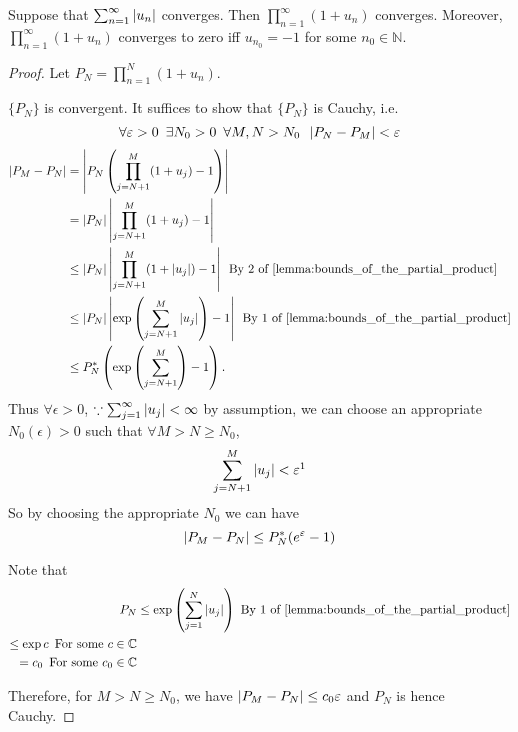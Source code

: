 \documentclass[notoc,notitlepage]{tufte-book}
\begin{document}
\begin{thm}[Theorem 19]\label{thm:theorem_19}
  Suppose that $\sum_{n=1}^{\infty} \left|u_n\right|$ converges. Then $\prod_{n=1}^{\infty} (1 + u_n)$ converges. Moreover, $\prod_{n=1}^{\infty} (1 + u_n)$ converges to zero iff $u_{n_0} = -1$ for some $n_0 \in \mathbb{N}$.
\end{thm}

\begin{proof}
  Let $P_N = \prod_{n=1}^{N} (1 + u_n)$.

  \WTS $\{P_N\}$ is convergent. It suffices to show that $\{P_N\}$ is Cauchy, i.e.
  \begin{equation*}
    \forall \varepsilon > 0 \enspace \exists N_0 > 0 \enspace \forall M, N > N_0 \enspace \left|P_N - P_M\right| < \varepsilon
  \end{equation*}
  \begin{align*}
    \abs{P_M - P_N} &= \abs{P_N \left( \prod_{j = N + 1}^{M} (1 + u_j) - 1\right)} \\
      &= \abs{P_N}\abs{\prod_{j=N + 1}^{M} (1 + u_j) - 1} \\
      &\leq \abs{P_N} \abs{\prod_{j = N + 1}^{M} (1 + \abs{u_j}) - 1} \enspace \text{By 2 of } \cref{lemma:bounds_of_the_partial_product} \\
      &\leq \abs{P_N} \abs{\exp{\left( \sum_{j=N + 1}^{M} \abs{u_j} \right)} - 1} \enspace \text{By 1 of } \cref{lemma:bounds_of_the_partial_product} \\
      &\leq P_N^* \left(\exp{\left(\sum_{j=N + 1}^{M} \right)} - 1 \right).
  \end{align*}
  Thus $\forall \epsilon > 0$, $\because \sum_{j=1}^{\infty} \left|u_j\right| < \infty$ by assumption, we can choose an appropriate $N_0(\epsilon) > 0$ such that $\forall M > N \geq N_0$,
  \begin{equation*}
    \sum_{j = N + 1}^{M} \abs{u_j} < \epsilon\footnotemark
  \end{equation*}
  So by choosing the appropriate $N_0$ we can have
  \begin{equation*}
    \left|P_M - P_N\right| \leq P_N^* (e^\varepsilon - 1)
  \end{equation*}

  Note that
  \begin{align*}
    P_N &\leq \exp{\left( \sum_{j=1}^{N} \abs{u_j} \right)} \enspace \text{By 1 of } \cref{lemma:bounds_of_the_partial_product} \\
      \leq \exp{c} \enspace \text{For some } c \in \mathbb{C} \\
      = c_0 \enspace \text{For some } c_0 \in \mathbb{C}
  \end{align*}

  Therefore, for $M > N \geq N_0$, we have $\left|P_M - P_N\right| \leq c_0 \varepsilon$ and $P_N$ is hence Cauchy.
\end{proof}
\end{document}
